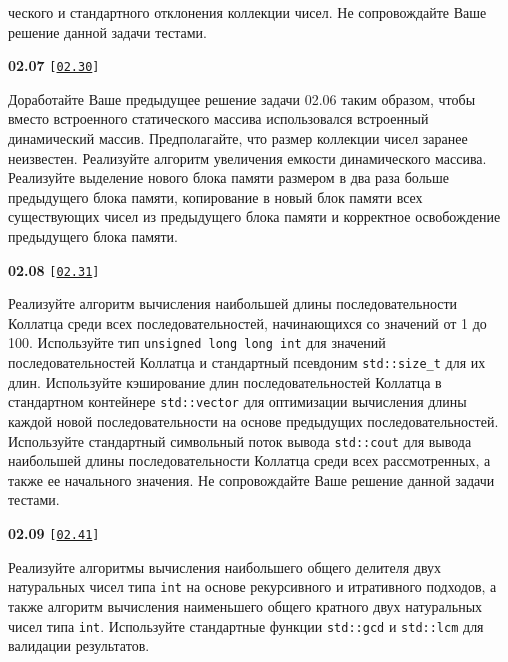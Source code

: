 \documentclass[a4paper,12pt]{article}
\begin{document}
ческого и стандартного отклонения коллекции чисел. Не сопровождайте Ваше решение данной задачи тестами.

\bigskip

{\large \textbf{02.07} \texttt{[\href{https://github.com/i-s-m-mipt/Education/blob/master/projects/examples/source/02.30.cpp}{\texttt{02.30}}]}}

\bigskip

Доработайте Ваше предыдущее решение задачи 02.06 таким образом, чтобы вместо встроенного статического массива использовался встроенный динамический массив. Предполагайте, что размер коллекции чисел заранее неизвестен. Реализуйте алгоритм увеличения емкости динамического массива. Реализуйте выделение нового блока памяти размером в два раза больше предыдущего блока памяти, копирование в новый блок памяти всех существующих чисел из предыдущего блока памяти и корректное освобождение предыдущего блока памяти.

\bigskip

{\large \textbf{02.08} \texttt{[\href{https://github.com/i-s-m-mipt/Education/blob/master/projects/examples/source/02.31.cpp}{\texttt{02.31}}]}}

\bigskip

Реализуйте алгоритм вычисления наибольшей длины последовательности Коллатца среди всех последовательностей, начинающихся со значений от 1 до 100. Используйте тип \lstinline{unsigned long long int} для значений последовательностей Коллатца и стандартный псевдоним \lstinline{std::size_t} для их длин. Используйте кэширование длин последовательностей Коллатца в стандартном контейнере \lstinline{std::vector} для оптимизации вычисления длины каждой новой последовательности на основе предыдущих последовательностей. Используйте стандартный символьный поток вывода \lstinline{std::cout} для вывода наибольшей длины последовательности Коллатца среди всех рассмотренных, а также ее начального значения. Не сопровождайте Ваше решение данной задачи тестами.

\bigskip

{\large \textbf{02.09} \texttt{[\href{https://github.com/i-s-m-mipt/Education/blob/master/projects/examples/source/02.41.cpp}{\texttt{02.41}}]}}

\bigskip

Реализуйте алгоритмы вычисления наибольшего общего делителя двух натуральных чисел типа \lstinline{int} на основе рекурсивного и итративного подходов, а также алгоритм вычисления наименьшего общего кратного двух натуральных чисел типа \lstinline{int}. Используйте стандартные функции \lstinline{std::gcd} и \lstinline{std::lcm} для валидации результатов.
\end{document}
